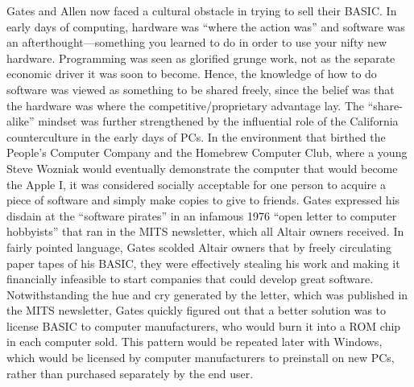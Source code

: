 Gates and Allen now faced a cultural obstacle in trying to sell their
BASIC.
In early days of computing, hardware was ``where the action was'' and
software was an afterthought---something you learned to do in order to
use your nifty new hardware.
Programming was seen as glorified grunge work, not as the separate
economic driver it was soon to become.
Hence, the knowledge of how to do software was viewed as something to be
shared freely, since the belief was that the hardware was where the
competitive/proprietary advantage lay.
The ``share-alike'' mindset was further strengthened by the influential
role of the California counterculture in the early days of PCs.  In the
environment that birthed the People's Computer Company and the Homebrew
Computer Club, where a young Steve Wozniak would
eventually demonstrate the computer that would become the Apple I, it
was considered socially acceptable for one person to
acquire a piece of software and simply make copies to give to friends.
Gates expressed his disdain at the ``software pirates'' 
in an infamous 1976 ``open letter to computer hobbyists'' that ran in
the MITS newsletter, which all Altair owners received.
In fairly pointed language, Gates scolded  Altair owners that by freely
circulating paper tapes of his BASIC, they were effectively stealing his
work and making it financially infeasible to start companies that could
develop great software.
Notwithstanding the hue and cry generated by the letter, which was
published in the MITS newsletter, Gates quickly figured out that a
better solution was to license BASIC to computer manufacturers, who
would burn it into a ROM chip in each computer sold.
This pattern would be repeated later with Windows, which would be
licensed by computer manufacturers to preinstall on new PCs, rather than
purchased separately by the end user.




